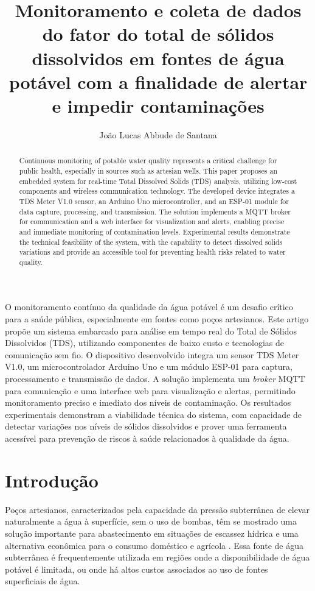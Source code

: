 \documentclass[12pt]{article}
\title{Monitoramento e coleta de dados do fator do total de sólidos dissolvidos em fontes de água potável com a finalidade de alertar e impedir contaminações}
\author{João Lucas Abbude de Santana}
\begin{document}
 

\maketitle

\begin{resumo}
O monitoramento contínuo da qualidade da água potável é um desafio crítico para a saúde pública, especialmente em fontes como poços artesianos. Este artigo propõe um sistema embarcado para análise em tempo real do Total de Sólidos Dissolvidos (TDS), utilizando componentes de baixo custo e tecnologias de comunicação sem fio. O dispositivo desenvolvido integra um sensor TDS Meter V1.0, um microcontrolador Arduino Uno e um módulo ESP-01 para captura, processamento e transmissão de dados. A solução implementa um \textit{broker} MQTT para comunicação e uma interface web para visualização e alertas, permitindo monitoramento preciso e imediato dos níveis de contaminação. Os resultados experimentais demonstram a viabilidade técnica do sistema, com capacidade de detectar variações nos níveis de sólidos dissolvidos e prover uma ferramenta acessível para prevenção de riscos à saúde relacionados à qualidade da água.
\end{resumo}

\begin{abstract}
Continuous monitoring of potable water quality represents a critical challenge for public health, especially in sources such as artesian wells. This paper proposes an embedded system for real-time Total Dissolved Solids (TDS) analysis, utilizing low-cost components and wireless communication technology. The developed device integrates a TDS Meter V1.0 sensor, an Arduino Uno microcontroller, and an ESP-01 module for data capture, processing, and transmission. The solution implements a MQTT broker for communication and a web interface for visualization and alerts, enabling precise and immediate monitoring of contamination levels. Experimental results demonstrate the technical feasibility of the system, with the capability to detect dissolved solids variations and provide an accessible tool for preventing health risks related to water quality.
\end{abstract}

\section{Introdução}

Poços artesianos, caracterizados pela capacidade da pressão subterrânea de elevar naturalmente a água à superfície, sem o uso de bombas, têm se mostrado uma solução importante para abastecimento em situações de escassez hídrica e uma alternativa econômica para o consumo doméstico e agrícola \cite{fagundes2015poccos}. Essa fonte de água subterrânea é frequentemente utilizada em regiões onde a disponibilidade de água potável é limitada, ou onde há altos custos associados ao uso de fontes superficiais de água.
\end{document}

